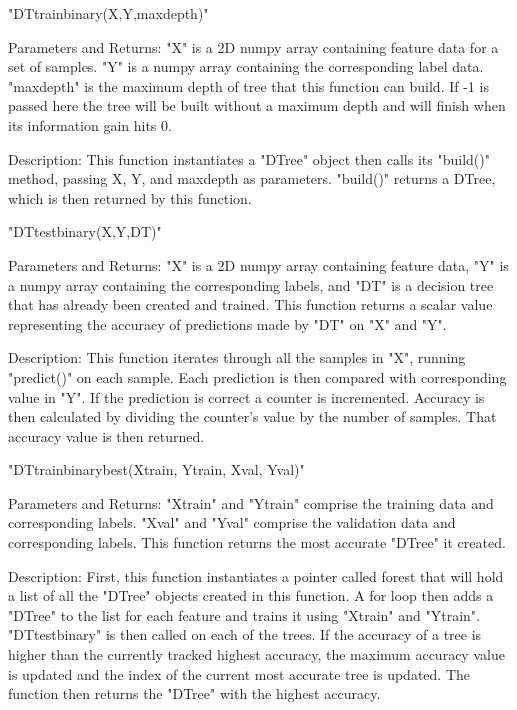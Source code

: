 \documentclass{article}
\begin{document}
\noindent "DT\textunderscore train\textunderscore binary(X,Y,max\textunderscore depth)"

\indent Parameters and Returns: "X" is a 2D numpy array containing feature data for a set of samples. "Y" is a numpy array containing the corresponding label data. "max\textunderscore depth" is the maximum depth of tree that this function can build. If -1 is passed here the tree will be built without a maximum depth and will finish when its information gain hits 0.

\indent Description: This function instantiates a "DTree" object then calls its "build()" method, passing X, Y, and max\textunderscore depth as parameters. "build()" returns a DTree, which is then returned by this function.

\noindent "DT\textunderscore test\textunderscore binary(X,Y,DT)"

\indent Parameters and Returns: "X" is a 2D numpy array containing feature data, "Y" is a numpy array containing the corresponding labels, and "DT" is a decision tree that has already been created and trained. This function returns a scalar value representing the accuracy of predictions made by "DT" on "X" and "Y".

\indent Description: This function iterates through all the samples in "X", running "predict()" on each sample. Each prediction is then compared with corresponding value in "Y". If the prediction is correct a counter is incremented. Accuracy is then calculated by dividing the counter's value by the number of samples. That accuracy value is then returned.

\noindent "DT\textunderscore train\textunderscore binary\textunderscore best(X\textunderscore train, Y\textunderscore train, X\textunderscore val, Y\textunderscore val)"

\indent Parameters and Returns: "X\textunderscore train" and "Y\textunderscore train" comprise the training data and corresponding labels. "X\textunderscore val" and "Y\textunderscore val" comprise the validation data and corresponding labels. This function returns the most accurate "DTree" it created.

\indent Description: First, this function instantiates a pointer called forest that will hold a list of all the "DTree" objects created in this function. A for loop then adds a "DTree" to the list for each feature and trains it using "X\textunderscore train" and "Y\textunderscore train". "DT\textunderscore test\textunderscore binary" is then called on each of the trees. If the accuracy of a tree is higher than the currently tracked highest accuracy, the maximum accuracy value is updated and the index of the current most accurate tree is updated. The function then returns the "DTree" with the highest accuracy.
\end{document}
